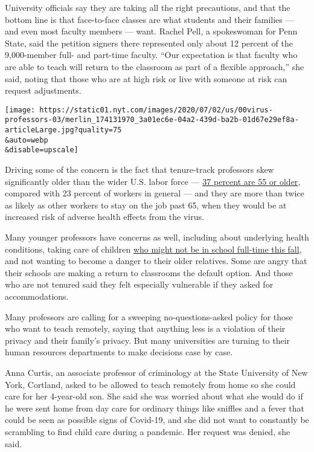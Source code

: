 University officials say they are taking all the right precautions, and
that the bottom line is that face-to-face classes are what students and
their families --- and even most faculty members --- want. Rachel Pell,
a spokeswoman for Penn State, said the petition signers there
represented only about 12 percent of the 9,000-member full- and
part-time faculty. ``Our expectation is that faculty who are able to
teach will return to the classroom as part of a flexible approach,'' she
said, noting that those who are at high risk or live with someone at
risk can request adjustments.

\texttt{[image: https://static01.nyt.com/images/2020/07/02/us/00virus-professors-03/merlin\_174131970\_3a01ec6e-04a2-439d-ba2b-01d67e29ef8a-articleLarge.jpg?quality=75\\\&auto=webp\\\&disable=upscale]}

Driving some of the concern is the fact that tenure-track professors
skew significantly older than the wider U.S. labor force ---
\href{https://www.insidehighered.com/quicktakes/2020/01/27/aging-faculty}{37
percent are 55 or older}, compared with 23 percent of workers in general
--- and they are more than twice as likely as other workers to stay on
the job past 65, when they would be at increased risk of adverse health
effects from the virus.

Many younger professors have concerns as well, including about
underlying health conditions, taking care of children
\href{https://www.nytimes.com/2020/06/26/us/coronavirus-schools-reopen-fall.html}{who
might not be in school full-time this fall}, and not wanting to become a
danger to their older relatives. Some are angry that their schools are
making a return to classrooms the default option. And those who are not
tenured said they felt especially vulnerable if they asked for
accommodations.

Many professors are calling for a sweeping no-questions-asked policy for
those who want to teach remotely, saying that anything less is a
violation of their privacy and their family's privacy. But many
universities are turning to their human resources departments to make
decisions case by case.

Anna Curtis, an associate professor of criminology at the State
University of New York, Cortland, asked to be allowed to teach remotely
from home so she could care for her 4-year-old son. She said she was
worried about what she would do if he were sent home from day care for
ordinary things like sniffles and a fever that could be seen as possible
signs of Covid-19, and she did not want to constantly be scrambling to
find child care during a pandemic. Her request was denied, she said.


